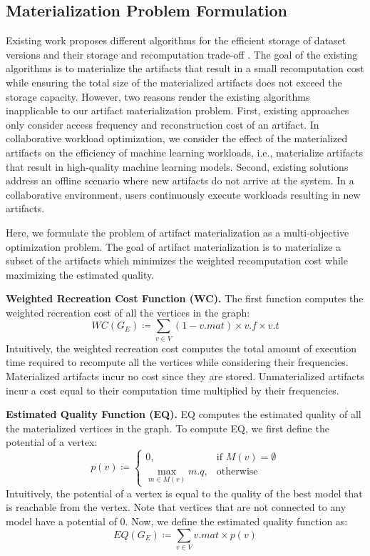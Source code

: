 \subsection{Materialization Problem Formulation}\label{subsec-materialization-problem}
Existing work proposes different algorithms for the efficient storage of dataset versions and their storage and recomputation trade-off \cite{bhattacherjee2015principles}.
The goal of the existing algorithms is to materialize the artifacts that result in a small recomputation cost while ensuring the total size of the materialized artifacts does not exceed the storage capacity.
However, two reasons render the existing algorithms inapplicable to our artifact materialization problem.
First, existing approaches only consider access frequency and reconstruction cost of an artifact.
In collaborative workload optimization, we consider the effect of the materialized artifacts on the efficiency of machine learning workloads, i.e., materialize artifacts that result in high-quality machine learning models.
Second, existing solutions address an offline scenario where new artifacts do not arrive at the system.
In a collaborative environment, users continuously execute workloads resulting in new artifacts.

Here, we formulate the problem of artifact materialization as a multi-objective optimization problem.
The goal of artifact materialization is to materialize a subset of the artifacts which minimizes the weighted recomputation cost while maximizing the estimated quality.

\textbf{Weighted Recreation Cost Function (WC).} 
The first function computes the weighted recreation cost of all the vertices in the graph:
\[
WC(G_E) \coloneqq  \sum\limits_{v \in V}  (1-v.mat) \times v.f \times v.t
\]
Intuitively, the weighted recreation cost computes the total amount of execution time required to recompute all the vertices while considering their frequencies.
Materialized artifacts incur no cost since they are stored.
Unmaterialized artifacts incur a cost equal to their computation time multiplied by their frequencies.

\textbf{Estimated Quality Function (EQ).} 
EQ computes the estimated quality of all the materialized vertices in the graph.
To compute EQ, we first define the potential of a vertex:
\[
p(v) \coloneqq  
		\begin{cases}
		0 , & \text{if }M(v) = \emptyset  \\
		\max\limits_{m \in M(v)} m.q, & \text{otherwise}
		\end{cases}
\]
Intuitively, the potential of a vertex is equal to the quality of the best model that is reachable from the vertex.
Note that vertices that are not connected to any model have a potential of 0.
Now, we define the estimated quality function as:
\[
EQ(G_E) \coloneqq  \sum\limits_{v \in V}  v.mat \times p(v)
\]


